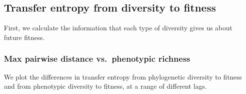 \documentclass[]{book}
\begin{document}
\hypertarget{transfer-entropy-from-diversity-to-fitness}{%
\subsection{Transfer entropy from diversity to fitness}\label{transfer-entropy-from-diversity-to-fitness}}

First, we calculate the information that each type of diversity gives us about future fitness.

\hypertarget{max-pairwise-distance-vs.phenotypic-richness}{%
\subsubsection{Max pairwise distance vs.~phenotypic richness}\label{max-pairwise-distance-vs.phenotypic-richness}}

We plot the differences in transfer entropy from phylogenetic diversity to fitness and from phenotypic diversity to fitness, at a range of different lags.
\end{document}
